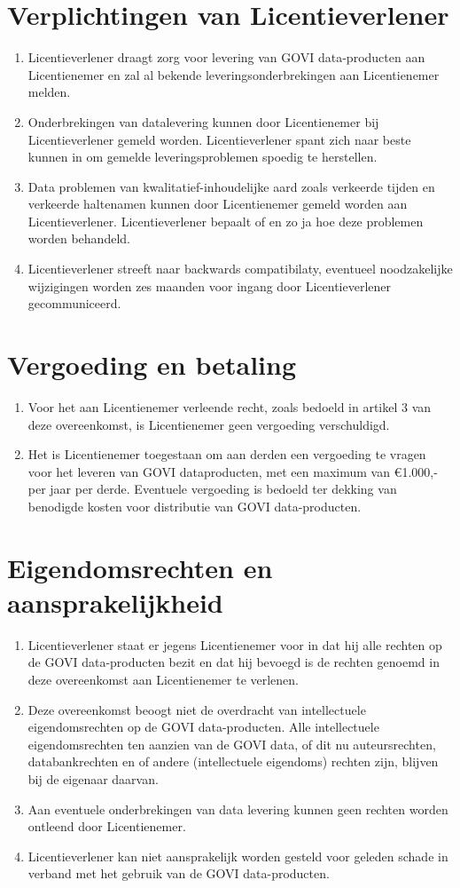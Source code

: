 \documentclass[10pt, a4paper]{article}
\begin{document}
\section{Verplichtingen van Licentieverlener}
\begin{enumerate}
\item Licentieverlener draagt zorg voor levering van GOVI data-producten aan Licentienemer en zal al bekende leveringsonderbrekingen aan Licentienemer melden.
\item Onderbrekingen van datalevering kunnen door Licentienemer bij Licentieverlener gemeld worden. Licentieverlener spant zich naar beste kunnen in om gemelde leveringsproblemen spoedig te herstellen.
\item Data problemen van kwalitatief-inhoudelijke aard zoals verkeerde tijden en verkeerde haltenamen kunnen door Licentienemer gemeld worden aan Licentieverlener. Licentieverlener bepaalt of en zo ja hoe deze problemen worden behandeld.
\item Licentieverlener streeft naar backwards compatibilaty, eventueel noodzakelijke wijzigingen worden zes maanden voor ingang door Licentieverlener gecommuniceerd.
\end{enumerate}


\section{Vergoeding en betaling}
\begin{enumerate}
\item Voor het aan Licentienemer verleende recht, zoals bedoeld in artikel 3 van deze overeenkomst, is Licentienemer geen vergoeding verschuldigd. 
\item Het is Licentienemer toegestaan om aan derden een vergoeding te vragen voor het leveren van GOVI dataproducten, met een maximum van \euro 1.000,- per jaar per derde. Eventuele vergoeding is bedoeld ter dekking van benodigde kosten voor distributie van GOVI data-producten.
\end{enumerate}

\section{Eigendomsrechten en aansprakelijkheid}
\begin{enumerate}
\item Licentieverlener staat er jegens Licentienemer voor in dat hij alle rechten op de GOVI data-producten bezit en dat hij bevoegd is de rechten genoemd in deze overeenkomst aan Licentienemer te verlenen.
\item Deze overeenkomst beoogt niet de overdracht van intellectuele eigendomsrechten op de GOVI data-producten. Alle intellectuele eigendomsrechten ten aanzien van de GOVI data, of dit nu auteursrechten, databankrechten en of andere (intellectuele eigendoms) rechten zijn, blijven bij de eigenaar daarvan.
\item Aan eventuele onderbrekingen van data levering kunnen geen rechten worden ontleend door Licentienemer.
\item Licentieverlener kan niet aansprakelijk worden gesteld voor geleden schade in verband met het gebruik van de GOVI data-producten.
\end{enumerate}
\newpage
\end{document}
